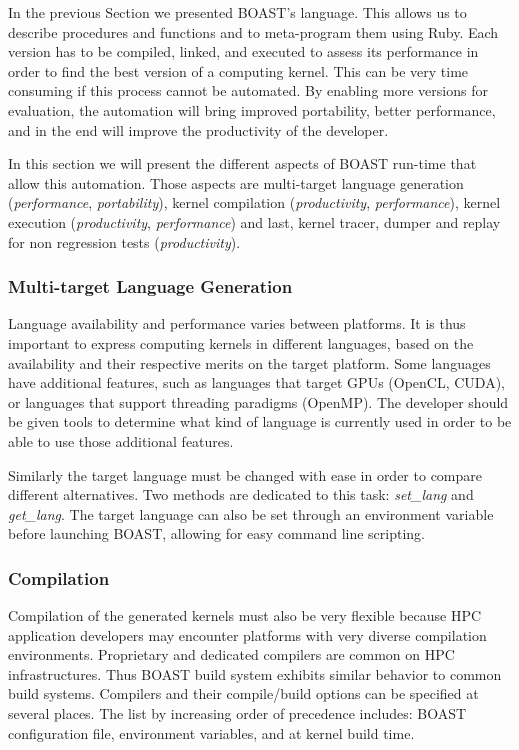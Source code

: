 \documentclass{IEEEtran}
\begin{document}
In the previous Section we presented BOAST's language. This allows us to
describe procedures and functions and to meta-program them using Ruby.  Each
version has to be compiled, linked, and executed to assess its performance in
order to find the best version of a computing kernel.  This can be very time
consuming if this process cannot be automated. By enabling more versions for
evaluation, the automation will bring improved portability, better performance,
and in the end will improve the productivity of the developer.

In this section we will present the different aspects of BOAST run-time that
allow this automation. Those aspects are multi-target language generation
(\emph{performance}, \emph{portability}), kernel compilation
(\emph{productivity}, \emph{performance}), kernel execution
(\emph{productivity}, \emph{performance}) and last, kernel tracer, dumper and
replay for non regression tests (\emph{productivity}).

  \subsubsection{Multi-target Language Generation\label{sec:multitarget}}
Language availability and performance varies between platforms. It is thus
important to express computing kernels in different languages, based on the
availability and their respective merits on the target platform. Some languages
have additional features, such as languages that target GPUs (OpenCL, CUDA), or
languages that support threading paradigms (OpenMP). The developer should be
given tools to determine what kind of language is currently used in order to be
able to use those additional features.

Similarly the target language must be changed with ease in order to compare
different alternatives. Two methods are dedicated to this task: \emph{set\_lang}
and \emph{get\_lang}. The target language can also be set through an environment
variable before launching BOAST, allowing for easy command line scripting.

  \subsubsection{Compilation}

Compilation of the generated kernels must also be very flexible because HPC
application developers may encounter platforms with very diverse compilation
environments.  Proprietary and dedicated compilers are common on HPC
infrastructures. Thus BOAST build system exhibits similar behavior to common
build systems. Compilers and their compile/build options can be specified at
several places. The list by increasing order of precedence includes: BOAST
configuration file, environment variables, and at kernel build time.
\end{document}
